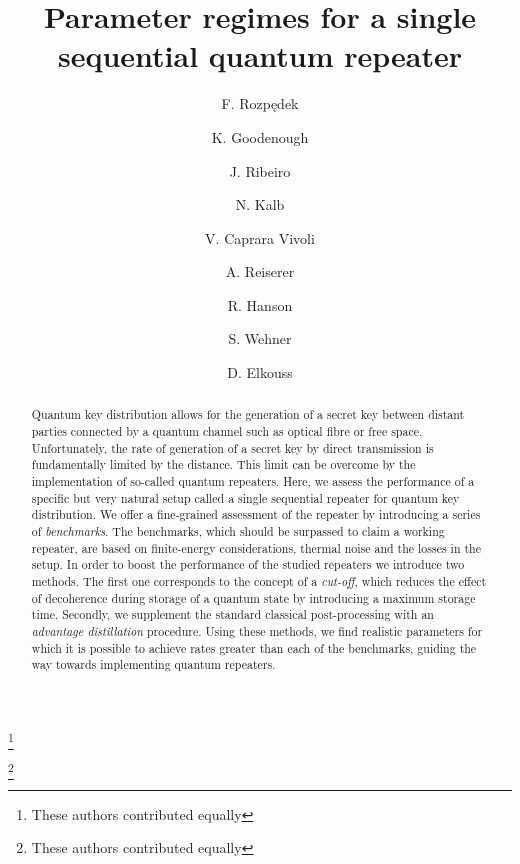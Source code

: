 \documentclass[aps,pra,reprint,superscriptaddress]{revtex4-1}
\begin{document}
\title{Parameter regimes for a single sequential quantum repeater \vspace{-2mm}}
\author{F. Rozp\k{e}dek}
\thanks{These authors contributed equally}
\author{K. Goodenough}
\thanks{These authors contributed equally}
\author{J. Ribeiro}
\author{N. Kalb}
\author{V. Caprara Vivoli}
\author{A. Reiserer}
\author{R. Hanson}
\author{S. Wehner}
\author{D. Elkouss}
\begin{abstract}
Quantum key distribution allows for the generation of a secret key between distant parties connected by a quantum channel such as optical fibre or free space. 
Unfortunately, the rate of generation of a secret key by direct transmission is fundamentally limited by the distance. This limit can be overcome by the implementation of so-called quantum repeaters. 
Here, we assess the performance of a specific but very natural setup called a single sequential repeater for quantum key distribution. We offer a fine-grained assessment of the repeater by introducing a series of \emph{benchmarks}. 
The benchmarks, which should be surpassed to claim a working repeater, are based on finite-energy considerations, thermal noise and the losses in the setup. 
In order to boost the performance of the studied repeaters we introduce two methods. The first one corresponds to the concept of a \emph{cut-off}, which reduces the effect of decoherence during storage of a quantum state by introducing a maximum storage time. Secondly, we supplement the standard classical post-processing with an \emph{advantage distillation} procedure.
Using these methods, we find realistic parameters for which it is possible to achieve rates greater than each of the benchmarks, guiding the way towards implementing quantum repeaters.
\end{abstract}    
\end{document}
